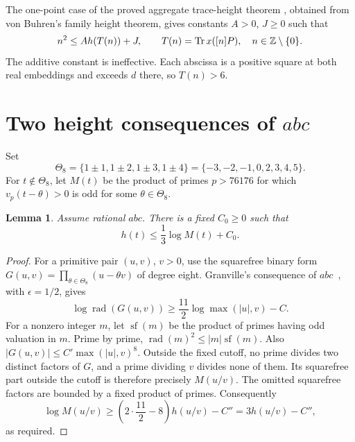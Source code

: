 \documentclass[11pt,a4paper]{article}
\newtheorem{lemma}[theorem]{Lemma}
\DeclareMathOperator{\Tr}{Tr}\DeclareMathOperator{\Nm}{N}
\DeclareMathOperator{\rad}{rad}
\begin{document}
The one-point case of the proved aggregate trace-height theorem
\cite{Trace}, obtained from von Buhren's family height theorem, gives
constants $A>0$, $J\ge0$ such that
\begin{equation}\label{eq:traceheight}
 n^2\le A h(T(n))+J,\qquad
 T(n)=\Tr x([n]P),\quad n\in\Z\setminus\{0\}.
\end{equation}
The additive constant is ineffective. Each abscissa is a positive square
at both real embeddings and exceeds $d$ there, so $T(n)>6$.

\section{Two height consequences of $abc$}

Set
\[
 \Theta_8=\{1\pm1,1\pm2,1\pm3,1\pm4\}
          =\{-3,-2,-1,0,2,3,4,5\}.
\]
For $t\notin\Theta_8$, let $M(t)$ be the product of primes $p>76176$
for which $v_p(t-\theta)>0$ is odd for some $\theta\in\Theta_8$.

\begin{lemma}\label{lem:contact}
Assume rational $abc$. There is a fixed $C_0\ge0$ such that
\[
                         h(t)\le\frac13\log M(t)+C_0.
\]
\end{lemma}
\begin{proof}
For a primitive pair $(u,v)$, $v>0$, use the squarefree binary form
$G(u,v)=\prod_{\theta\in\Theta_8}(u-\theta v)$ of degree eight.
Granville's consequence of $abc$~\cite[Proposition~1]{Granville},
with $\epsilon=1/2$, gives
\[
 \log\rad(G(u,v))\ge\frac{11}{2}\log\max(|u|,v)-C.
\]
For a nonzero integer $m$, let $\operatorname{sf}(m)$ be the product
of primes having odd valuation in $m$. Prime by prime,
$\rad(m)^2\le |m|\operatorname{sf}(m)$.
Also $|G(u,v)|\le C'\max(|u|,v)^8$.
Outside the fixed cutoff, no prime divides two distinct factors of
$G$, and a prime dividing $v$ divides none of them. Its squarefree
part outside the cutoff is therefore precisely $M(u/v)$.
The omitted squarefree factors are bounded by a fixed product of primes.
Consequently
\[
 \log M(u/v)\ge\left(2\cdot\frac{11}{2}-8\right)h(u/v)-C''
                 =3h(u/v)-C'',
\]
as required.
\end{proof}
\end{document}

